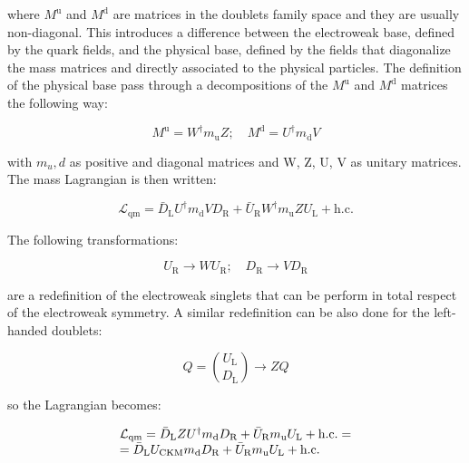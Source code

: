 where $M^{\text{u}}$ and  $M^{\text{d}}$ are matrices in the doublets family space and they are usually non-diagonal. This introduces a difference between the electroweak base, defined by the quark fields, and the physical base, defined by the fields that diagonalize the mass matrices and directly associated to the physical particles.
The definition of the physical base pass through a decompositions of the $M^{\text{u}}$ and $M^{\text{d}}$ matrices the following way:

\begin{equation}
M^{\text{u}} = W^{\dagger}m_{\text{u}}Z; \quad M^{\text{d}} = U^{\dagger}m_{\text{d}}V
\end{equation}

with $m_u,d$ as positive and diagonal matrices and W, Z, U, V as unitary matrices. The mass Lagrangian is then written:

\begin{equation}
\mathcal{L}_{\text{qm}} = \bar{D}_{\text{L}}U^{\dagger}m_{\text{d}}VD_{\text{R}} + \bar{U}_{\text{R}}W^{\dagger}m_{\text{u}}ZU_{\text{L}} + \text{h.c.}
\end{equation}

The following transformations:

\begin{equation}
U_{\text{R}} \longrightarrow W U_{\text{R}}; \quad D_{\text{R}} \longrightarrow V D_{\text{R}}
\end{equation}

are a redefinition of the electroweak singlets that can be perform in total respect of the electroweak symmetry. A similar redefinition can be also done for the left-handed doublets:

\begin{equation}
Q = \binom{U_{\text{L}}}{D_{\text{L}}} \longrightarrow ZQ
\end{equation}

so the Lagrangian becomes:

\begin{equation}
\begin{array}{l c l}
\mathcal{L}_{\text{qm}} = \bar{D}_{\text{L}}ZU^{\dagger}m_{\text{d}}D_{\text{R}} + \bar{U}_{\text{R}}m_{\text{u}}U_{\text{L}} + \text{h.c.} = \\
= \bar{D}_{\text{L}}U_{\text{CKM}}m_{\text{d}}D_{\text{R}} + \bar{U}_{\text{R}}m_{\text{u}}U_{\text{L}} + \text{h.c.}
\label{eq::Lqm_Uckm}
\end{array}
\end{equation}

